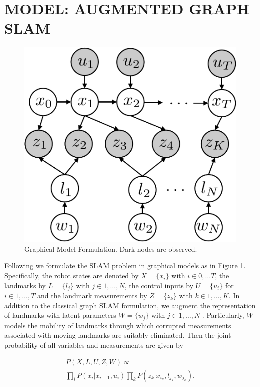 \section{MODEL: AUGMENTED GRAPH SLAM}
\label{sec:model}
\begin{figure}[!t]
\begin{center}
 \includegraphics[width=0.5\columnwidth]{fig/model} 
\end{center}
\caption{Graphical Model Formulation. Dark nodes are observed.}
\label{fig:model}
\end{figure}

Following \cite{isam} we formulate the SLAM problem in graphical models as in Figure \ref{fig:model}. Specifically, the robot states are denoted by $X = \{x_i\}$ with $i \in 0, \dots T$, the landmarks by $L = \{l_j\}$ with $j \in 1,\dots, N$, the control inputs by $U = \{u_i\}$ for $i \in 1,\dots, T$ and the landmark measurements by $Z = \{z_k\}$ with $k \in 1, \dots, K$. In addition to the classical graph SLAM formulation, we augment the representation of landmarks with latent parameters $W = \{w_j\}$ with $j \in 1, \dots, N$ . Particularly, $W$ models the mobility of landmarks through which corrupted measurements associated with moving landmarks are suitably eliminated. Then the joint probability of all variables and measurements are given by

\begin{multline}
P(X, L, U, Z, W) \propto  \\
\prod\limits_{i}P(x_i|x_{i-1}, u_i)\prod\limits_{k}P(z_k|x_{i_k}, l_{j_k}, w_{j_k}).
\label{eq:jointProb}
\end{multline}

